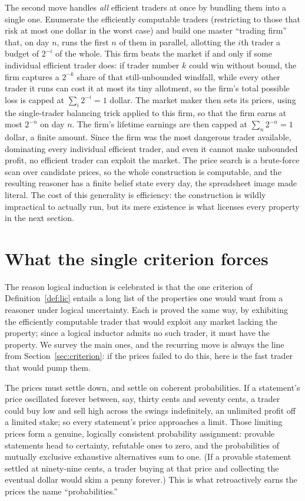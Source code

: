 \documentclass[10pt]{article}
\theoremstyle{definition}
\theoremstyle{remark}
\begin{document}
The second move handles \emph{all} efficient traders at once by bundling them into a single one. Enumerate the efficiently computable traders (restricting to those that risk at most one dollar in the worst case) and build one master ``trading firm'' that, on day $n$, runs the first $n$ of them in parallel, allotting the $i$th trader a budget of $2^{-i}$ of the whole. This firm beats the market if and only if some individual efficient trader does: if trader number $k$ could win without bound, the firm captures a $2^{-k}$ share of that still-unbounded windfall, while every other trader it runs can cost it at most its tiny allotment, so the firm's total possible loss is capped at $\sum_i 2^{-i} = 1$ dollar. The market maker then sets its prices, using the single-trader balancing trick applied to this firm, so that the firm earns at most $2^{-n}$ on day $n$. The firm's lifetime earnings are then capped at $\sum_n 2^{-n} = 1$ dollar, a finite amount. Since the firm was the most dangerous trader available, dominating every individual efficient trader, and even it cannot make unbounded profit, no efficient trader can exploit the market. The price search is a brute-force scan over candidate prices, so the whole construction is computable, and the resulting reasoner has a finite belief state every day, the spreadsheet image made literal. The cost of this generality is efficiency: the construction is wildly impractical to actually run, but its mere existence is what licenses every property in the next section.

\section{What the single criterion forces}
\label{sec:properties}

The reason logical induction is celebrated is that the one criterion of Definition~\ref{def:lic} entails a long list of the properties one would want from a reasoner under logical uncertainty. Each is proved the same way, by exhibiting the efficiently computable trader that would exploit any market lacking the property; since a logical inductor admits no such trader, it must have the property. We survey the main ones, and the recurring move is always the line from Section~\ref{sec:criterion}: if the prices failed to do this, here is the fast trader that would pump them.

The prices must settle down, and settle on coherent probabilities. If a statement's price oscillated forever between, say, thirty cents and seventy cents, a trader could buy low and sell high across the swings indefinitely, an unlimited profit off a limited stake; so every statement's price approaches a limit. Those limiting prices form a genuine, logically consistent probability assignment: provable statements head to certainty, refutable ones to zero, and the probabilities of mutually exclusive exhaustive alternatives sum to one. (If a provable statement settled at ninety-nine cents, a trader buying at that price and collecting the eventual dollar would skim a penny forever.) This is what retroactively earns the prices the name ``probabilities.''
\end{document}
